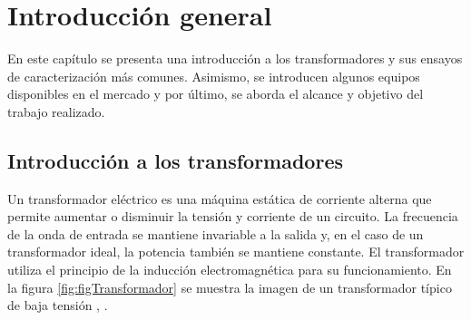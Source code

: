 
\chapter{Introducción general} %

\label{Chapter1} %
\label{IntroGeneral}


\newcommand{\keyword}[1]{\textbf{#1}}
\newcommand{\tabhead}[1]{\textbf{#1}}
\newcommand{\code}[1]{\texttt{#1}}
\newcommand{\file}[1]{\texttt{\bfseries#1}}
\newcommand{\option}[1]{\texttt{\itshape#1}}
\newcommand{\grados}{$^{\circ}$}

En este capítulo se presenta una introducción a los transformadores y sus ensayos de caracterización más comunes. Asimismo, se introducen algunos equipos disponibles en el mercado y por último, se aborda el alcance y objetivo del trabajo realizado.



\section{Introducción a los transformadores}

Un transformador eléctrico es una máquina estática de corriente alterna que permite aumentar o disminuir la tensión y corriente de un circuito. La frecuencia de la onda de entrada se mantiene invariable a la salida y, en el caso de un transformador ideal, la potencia también se mantiene constante. El transformador utiliza el principio de la inducción electromagnética para su funcionamiento. En la figura \ref{fig:figTransformador} se muestra la imagen de un transformador típico de baja tensión \citep{TRAFO_WIKI}, \citep{TRAFO_2}.

